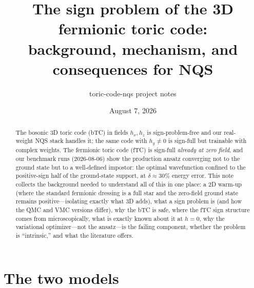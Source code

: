 \documentclass[11pt]{article}
\title{The sign problem of the 3D fermionic toric code:\\
background, mechanism, and consequences for NQS}
\author{toric-code-nqs project notes}
\date{August 7, 2026}
\begin{document}
\maketitle

\begin{abstract}
\noindent
The bosonic 3D toric code (bTC) in fields $h_x,h_z$ is sign-problem-free and our
real-weight NQS stack handles it; the same code with $h_y\neq0$ is sign-full but
trainable with complex weights. The fermionic toric code (fTC) is sign-full
\emph{already at zero field}, and our benchmark runs (2026-08-06) show the
production ansatz converging not to the ground state but to a well-defined
impostor: the optimal wavefunction confined to the positive-sign half of the
ground-state support, at $\delta\approx30\%$ energy error. This note collects
the background needed to understand all of this in one place: a 2D warm-up
(where the standard fermionic dressing is a full star and the zero-field ground
state remains positive---isolating exactly what 3D adds), what a sign
problem is (and how the QMC and VMC versions differ), why the bTC is safe, where
the fTC sign structure comes from microscopically, what is exactly known about
it at $h=0$, why the variational optimizer---not the ansatz---is the failing
component, whether the problem is ``intrinsic,'' and what the literature offers.
\end{abstract}

\tableofcontents

\section{The two models}
\end{document}

